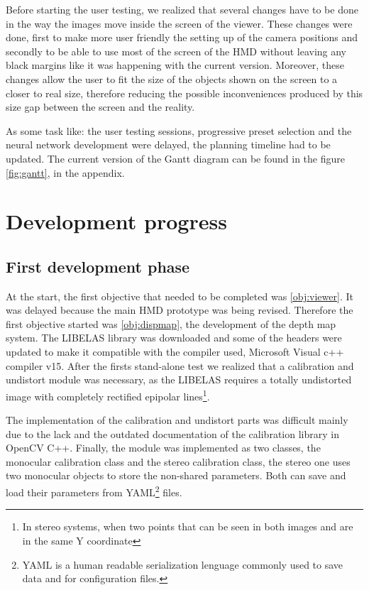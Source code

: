 \documentclass[10pt,a4paper,twocolumn,twoside]{article}
\begin{document}
	Before starting the user testing, we realized that several changes have to be done in the way the images move inside the screen of the viewer. These changes were done, first to make more user friendly the setting up of the camera positions and secondly to be able to use most of the screen of the HMD without leaving any black margins like it was happening with the current version. Moreover, these changes allow the user to fit the size of the objects shown on the screen to a closer to real size, therefore reducing the possible inconveniences produced by this size gap between the screen and the reality.

	As some task like: the user testing sessions, progressive preset selection and the neural network development were delayed, the planning timeline had to be updated. The current version of the Gantt diagram can be found in the figure \ref{fig:gantt}, in the appendix.
	
	
	\section{Development progress}
	 
	\subsection{First development phase}
	
	At the start, the first objective that needed to be completed was \ref{obj:viewer}. It was delayed because the main HMD prototype was being revised. Therefore the first objective started was \ref{obj:dispmap}, the development of the depth map system. The LIBELAS library was downloaded and some of the headers were updated to make it compatible with the compiler used, Microsoft Visual c++ compiler v15. After the firsts stand-alone test we realized that a calibration and undistort module was necessary, as the LIBELAS requires a totally undistorted image with completely rectified epipolar lines\footnote{In stereo systems, when two points that can be seen in both images and are in the same Y coordinate}. 
	
	The implementation of the calibration and undistort parts was difficult mainly due to the lack and the outdated documentation of the calibration library in OpenCV C++. Finally, the module was implemented as two classes, the monocular calibration class and the stereo calibration class, the stereo one uses two monocular objects to store the non-shared parameters. Both can save and load their parameters from YAML\footnote{YAML is a human readable serialization lenguage commonly used to save data and for configuration files.} files.
	
\end{document}
